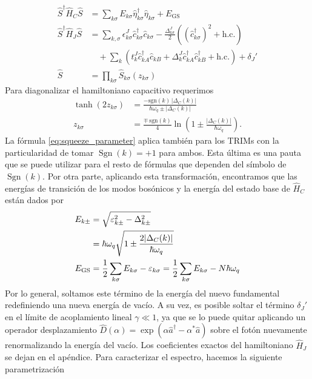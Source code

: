 \begin{subequations}
    \begin{align}
        \hat S^\dag \hat H_C \hat S &= \sum_{k\sigma} E_{k\sigma}\hat \eta_{k\sigma}^\dag \hat \eta_{k\sigma} + E_{\text{GS}}\\
        \hat S^\dag \hat H_J \hat S &= \sum_{k,\sigma}
                \epsilon^J_{k\sigma} \hat c^\dag_{k\sigma}\hat c_{k\sigma} 
                - \frac{\Delta^J_{k\sigma}}{2}\left((\hat c^\dag_{k\sigma})^2 + \text{h.c.}\right) \nonumber\\
               &\quad +\sum_{k}\left(t^J_k\hat c^\dag_{kA} \hat c_{kB} +\Delta^J_k\hat c^\dag_{kA}\hat c_{kB}^\dag+ \text{h.c.}\right) + \delta_{J}'\\
        \hat S &= \prod_{k\sigma} \hat S_{k\sigma}(z_{k\sigma})
    \end{align} \label{eq:squeeze_transform_total}
\end{subequations}
Para diagonalizar el hamiltoniano capacitivo requerimos 
\begin{align}
    \tanh(2z_{k\sigma}) 
        &= \frac{-\mathrm{sgn}(k)\,|\Delta_C(k)|}
               {\hbar\omega_q \pm |\Delta_C(k)|} \nonumber\\
    z_{k\sigma} 
        &= \frac{\mp\,\mathrm{sgn}(k)}{4}
           \ln\!\left(1 \pm \frac{|\Delta_C(k)|}{\hbar\omega_q}\right).
           \label{eq:squeeze_parameter}
\end{align}
La fórmula \eqref{eq:squeeze_parameter} aplica también para los TRIMs con la particularidad de tomar $\operatorname{Sgn}(k) = +1$ para ambos. Esta última es una pauta que se puede utilizar para el resto de fórmulas que dependen del símbolo de $\operatorname{Sgn}(k)$. Por otra parte, aplicando esta transformación, encontramos que las energías de transición de los modos bosónicos y la energía del estado base de $\hat H_C$ están dados por
\begin{subequations}
    \begin{align}
        E_{k\pm} &= \sqrt{\varepsilon_{k\pm}^2 - \Delta_{k\pm}^2}\nonumber\\
        &= \hbar \omega_q \sqrt{1 \pm \frac{2\abs{\Delta_C(k)}}{\hbar \omega_q}}\\
        E_{\text{GS}} &= \frac{1}{2}\sum_{k\sigma}E_{k\sigma} - \varepsilon_{k\sigma} = \frac{1}{2}\sum_{k\sigma}E_{k\sigma} - N \hbar \omega_q
    \end{align}
\end{subequations}
Por lo general, soltamos este término de la energía del nuevo fundamental redefiniendo una nueva energía de vacío. A su vez, es posible soltar el término $\delta_J'$ en el límite de acoplamiento lineal $\gamma \ll 1$, ya que se lo puede quitar aplicando un operador desplazamiento $\hat D(\alpha) = \exp(\alpha \hat a^\dag - \alpha^*\hat a)$ sobre el fotón nuevamente renormalizando la energía del vacío. Los coeficientes exactos del hamiltoniano $\hat H_J$ se dejan en el apéndice. Para caracterizar el espectro, hacemos la siguiente parametrización
